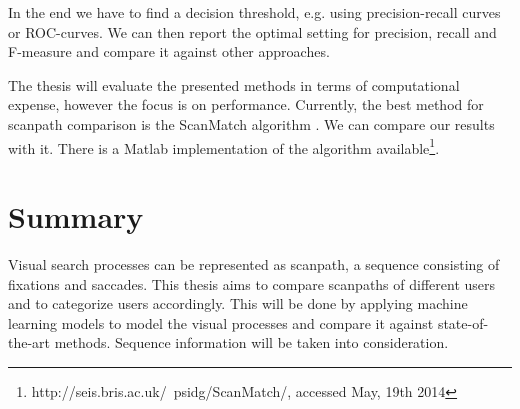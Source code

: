 \documentclass[
        a4paper,     %
        parskip      %
        ]{scrartcl} %
\begin{document}
In the end we have to find a decision threshold, e.g. using precision-recall curves or ROC-curves. We can then report the optimal setting for precision, recall and F-measure and compare it against other approaches. 

The thesis will evaluate the presented methods in terms of computational expense, however the focus is on performance. 
Currently, the best method for scanpath comparison is the ScanMatch algorithm \cite{CristinoEtAl2010}. We can compare our results with it. There is a Matlab implementation of the algorithm available\footnote{http://seis.bris.ac.uk/~psidg/ScanMatch/, accessed May, 19th 2014}.


\section{Summary}
Visual search processes can be represented as scanpath, a sequence consisting of fixations and saccades. This thesis aims to compare scanpaths of different users and to categorize users accordingly. This will be done by applying machine learning models to model the visual processes and compare it against state-of-the-art methods. Sequence information will be taken into consideration. 

    
\end{document}
